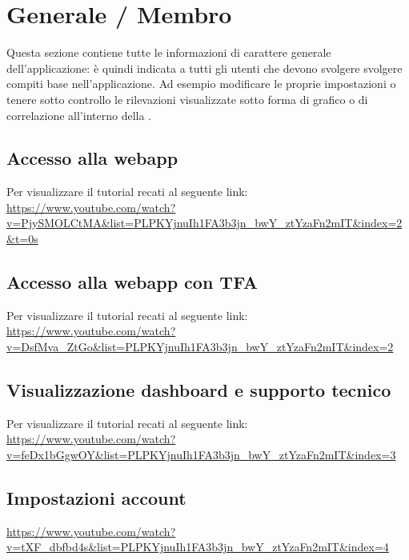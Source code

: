 \section{Generale / Membro}
Questa sezione contiene tutte le informazioni di carattere generale dell'applicazione: è quindi indicata a tutti gli utenti che devono svolgere svolgere compiti base nell'applicazione. Ad esempio modificare le proprie impostazioni o tenere sotto controllo le rilevazioni visualizzate sotto forma di grafico o di correlazione all'interno della .

\subsection{Accesso alla webapp}
Per visualizzare il tutorial recati al seguente link: 
\url{https://www.youtube.com/watch?v=PjySMOLCtMA&list=PLPKYjnuIh1FA3b3jn_bwY_ztYzaFn2mIT&index=2&t=0s}

\subsection{Accesso alla webapp con TFA}
Per visualizzare il tutorial recati al seguente link: 
\url{https://www.youtube.com/watch?v=DsfMva_ZtGo&list=PLPKYjnuIh1FA3b3jn_bwY_ztYzaFn2mIT&index=2}

\subsection{Visualizzazione dashboard e supporto tecnico}
Per visualizzare il tutorial recati al seguente link: 
\url{https://www.youtube.com/watch?v=feDx1bGgwOY&list=PLPKYjnuIh1FA3b3jn_bwY_ztYzaFn2mIT&index=3}

\subsection{Impostazioni account}
\url{https://www.youtube.com/watch?v=tXF_dbfbd4s&list=PLPKYjnuIh1FA3b3jn_bwY_ztYzaFn2mIT&index=4}

